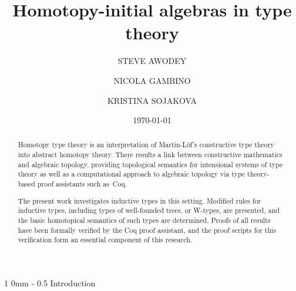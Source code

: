 \documentclass[reqno,10pt,a4paper,oneside]{amsart}
\makeatletter
\numberwithin{equation}{section}
\renewcommand{\section}{\@startsection
  {section}%
   {1}%
  {0mm}%
   {-\baselineskip}%
  {0.5\baselineskip}%
   {\Large\bfseries}}%
\theoremstyle{mythm}
\theoremstyle{mydef}
\theoremstyle{myrmk}
\makeatother
\begin{document}
\title{Homotopy-initial algebras in type theory}
\author[S. Awodey]{STEVE AWODEY}
\address{Carnegie Mellon University}
\author[N. Gambino]{NICOLA GAMBINO}
\address{School of Mathematics, University of Leeds}
\author[K. Sojakova]{KRISTINA SOJAKOVA}
\address{Carnegie Mellon University}
\date{\today}



\begin{abstract}
Homotopy type theory is an interpretation of Martin-L\"of's constructive type theory into abstract homotopy theory.   There results a link between constructive mathematics and algebraic topology, providing topological semantics for intensional systems of type theory as well as a computational approach to algebraic topology via type theory-based proof assistants such as~Coq.

The present work investigates inductive types in this setting. Modified rules for inductive types, including types of well-founded trees, or W-types, are presented, and the basic homotopical semantics of such types are determined.  Proofs of all results have been formally verified by the Coq proof assistant, and the proof scripts for this verification form an essential component of this research.      
\end{abstract}


\maketitle



\begin{small}
\tableofcontents
\end{small}

\section{Introduction}
\end{document}
